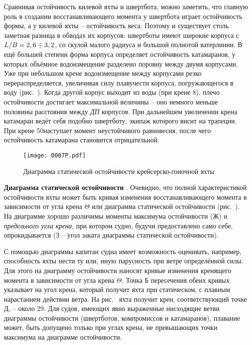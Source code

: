 Сравнивая остойчивость килевой яхты и швертбота, можно заметить, что
главную роль в создании восстанавливающего момента у швертбота играет
остойчивость формы, а у килевой яхты \--- остойчивость веса. Поэтому и
существует столь заметная разница в обводах их корпусов: швертботы
имеют широкие корпуса с $L/B = 2,6 \div 3,2$, со скулой малого
радиуса и большой полнотой ватерлинии. В ещё большей степени форма
корпуса определяет остойчивость катамаранов, у которых объёмное
водоизмещение разделено поровну между двумя корпусами. Уже при
небольшом крене водоизмещение между корпусами резко
перераспределяется, увеличивая силу плавучести корпуса, погружающегося
в воду (рис.~). Когда другой корпус выходит из воды (при крене
8\gr), плечо остойчивости достигает максимальной величины \---
оно немного меньше половины расстояния между \textit{ДП} корпусов. При
дальнейшем увеличении крена катамаран ведёт себя подобно швертботу,
экипаж которого висит на трапеции. При крене 50\gr наступает
момент неустойчивого равновесия, после чего остойчивость катамарана
становится отрицательной.

\begin{figure*}[htb]
  \centering
  \texttt{[image: 0007P.pdf]}
  \caption{Диаграмма статической остойчивости крейсерско-гоночной яхты}
  \label{fig:7}
\end{figure*}

\textbf{Диаграмма статической остойчивости}
.
Очевидно, что полной характеристикой остойчивости
яхты может быть кривая изменения восстанавливающего момента
 в зависимости от угла крена $\Theta$ или диаграмма
статической остойчивости (рис.~). На диаграмме хорошо различимы
моменты максимума остойчивости (Ж) и \textit{предельного угла крена}, при
котором судно, будучи предоставлено само себе, опрокидывается (З \---
угол заката диаграммы статической остойчивости).

С помощью диаграммы капитан судна имеет возможность оценивать,
например, способность яхты нести ту или, иную парусность при ветре
определённой силы. Для этого на диаграмму остойчивости наносят кривые
изменения кренящего момента  в зависимости от угла крена
$\Theta$. Точка Б пересечения обеих кривых указывает на угол крена,
который получит яхта при статическом, с плавным нарастанием действии
ветра. На рис.~ яхта получит крен, соответствующий точке Д,
\--- около 29\gr. Для судов, имеющих явно выраженные нисходящие ветви
диаграммы остойчивости (швертботов, компромиссов и катамаранов),
плавание может, быть допущено только при углах крена, не превышающих
точки максимума на диаграмме остойчивости.

